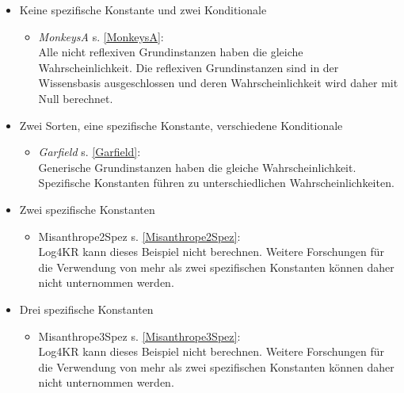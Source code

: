 \documentclass[draft]{scrreprt}
\begin{document}
\begin{itemize}
\begin{itemize}
\end{itemize}

\item{Keine spezifische Konstante und zwei Konditionale}
\begin{itemize}
	\item \textsl{MonkeysA} \label{BMonkeysA} s. \ref{MonkeysA}:\\
	Alle nicht reflexiven Grundinstanzen haben die gleiche Wahrscheinlichkeit. Die reflexiven Grundinstanzen sind in der Wissensbasis ausgeschlossen und deren Wahrscheinlichkeit wird daher mit Null berechnet.

\end{itemize}
	
\item{Zwei Sorten, eine spezifische Konstante, verschiedene Konditionale}
\begin{itemize}
	\item \textsl{Garfield} \label{BGarfield} s. \ref{Garfield}:\\
	Generische Grundinstanzen haben die gleiche Wahrscheinlichkeit. Spezifische Konstanten führen zu unterschiedlichen Wahrscheinlichkeiten.
\end{itemize}

\item Zwei spezifische Konstanten 
\begin{itemize}
 \item{Misanthrope2Spez}	\label{BMisanthrope2Spez} s. \ref{Misanthrope2Spez}:\\
Log4KR kann dieses Beispiel nicht berechnen. Weitere Forschungen für die Verwendung von mehr als zwei spezifischen Konstanten können daher nicht unternommen werden.
\end{itemize}


	\item Drei spezifische Konstanten 
	\begin{itemize}
		\item{Misanthrope3Spez}	\label{BMisanthrope3Spez} s. \ref{Misanthrope3Spez}:\\
	Log4KR kann dieses Beispiel nicht berechnen. Weitere Forschungen für die Verwendung von mehr als zwei spezifischen Konstanten können daher nicht unternommen werden.
	\end{itemize}

\end{itemize}
\end{document}
